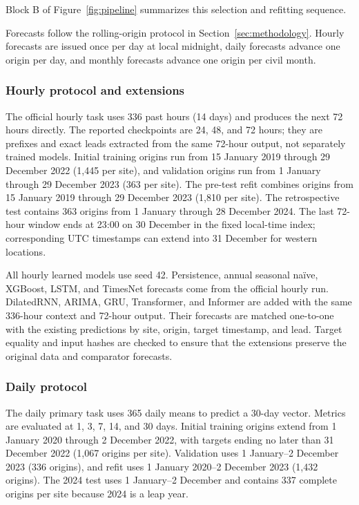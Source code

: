 Block B of Figure~\ref{fig:pipeline} summarizes this selection and refitting
sequence.

Forecasts follow the rolling-origin protocol in Section~\ref{sec:methodology}.
Hourly forecasts are issued once per day at local midnight, daily forecasts
advance one origin per day, and monthly forecasts advance one origin per
civil month.



\subsubsection{Hourly protocol and extensions}

The official hourly task uses 336 past hours (14 days) and produces the next
72 hours directly. The reported checkpoints are 24, 48, and 72 hours; they are
prefixes and exact leads extracted from the same 72-hour output, not separately
trained models. Initial training origins run from 15 January 2019 through
29 December 2022 (1,445 per site), and validation origins run from
1 January through 29 December 2023 (363 per site). The pre-test refit combines
origins from 15 January 2019 through 29 December 2023 (1,810 per site). The
retrospective test contains 363 origins from 1 January through
28 December 2024. The last 72-hour window ends at 23:00 on 30 December in the
fixed local-time index; corresponding UTC timestamps can extend into
31 December for western locations.

All hourly learned models use seed 42. Persistence, annual seasonal
na\"ive, XGBoost, LSTM, and TimesNet forecasts come from the official hourly
run. DilatedRNN, ARIMA, GRU, Transformer, and Informer are added with the
same 336-hour context and 72-hour output. Their forecasts are matched
one-to-one with the existing predictions by site, origin, target timestamp,
and lead. Target equality and input hashes are checked to ensure that the
extensions preserve the original data and comparator forecasts.

\subsubsection{Daily protocol}

The daily primary task uses 365 daily means to predict a 30-day vector. Metrics
are evaluated at 1, 3, 7, 14, and 30 days. Initial training origins extend from
1 January 2020 through 2 December 2022, with targets ending no later than
31 December 2022 (1,067 origins per site). Validation uses
1 January--2 December 2023 (336 origins), and refit uses
1 January 2020--2 December 2023 (1,432 origins). The 2024 test uses
1 January--2 December and contains 337 complete origins per site because 2024
is a leap year.


